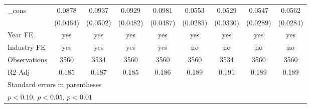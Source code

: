 \begin{table}[htbp]
\begin{tabular}{l*{8}{c}}
\_cons              &      0.0878\sym{*}  &      0.0937\sym{*}  &      0.0929\sym{*}  &      0.0981\sym{**} &      0.0553\sym{*}  &      0.0529         &      0.0547\sym{*}  &      0.0562\sym{*}  \\
                    &    (0.0464)         &    (0.0502)         &    (0.0482)         &    (0.0487)         &    (0.0285)         &    (0.0330)         &    (0.0289)         &    (0.0284)         \\
\hline
Year FE             &         yes         &         yes         &         yes         &         yes         &         yes         &         yes         &         yes         &         yes         \\
Industry FE         &         yes         &         yes         &         yes         &         yes         &          no         &          no         &          no         &          no         \\
Observations        &        3560         &        3534         &        3560         &        3560         &        3560         &        3534         &        3560         &        3560         \\
R2-Adj              &       0.185         &       0.187         &       0.185         &       0.186         &       0.189         &       0.191         &       0.189         &       0.189         \\
\hline\hline
\multicolumn{9}{l}{\footnotesize Standard errors in parentheses}\\
\multicolumn{9}{l}{\footnotesize \sym{*} \(p<0.10\), \sym{**} \(p<0.05\), \sym{***} \(p<0.01\)}\\
\end{tabular}
\end{table}
